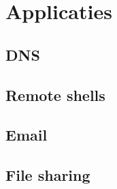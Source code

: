 \section{Applicaties}

\begin{frame}
\end{frame}


\subsection{DNS}

\begin{frame}
\end{frame}


\subsection{Remote shells}

\begin{frame}
\end{frame}



\subsection{Email}

\begin{frame}
\end{frame}


\subsection{File sharing}


\begin{frame}
\end{frame}

